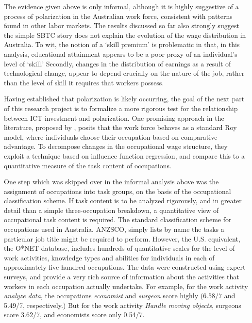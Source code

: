 \documentclass[a4paper,11pt,notitlepage]{article}
\begin{document}
The evidence given above is only informal, although it is highly suggestive of a process of polarization in the Australian work force, consistent with patterns found in other labor markets. The results discussed so far also strongly suggest the simple SBTC story does not explain the evolution of the wage distribution in Australia. To wit, the notion of a `skill premium' is problematic in that, in this analysis, educational attainment appears to be a poor proxy of an individual's level of `skill.' Secondly, changes in the distribution of earnings as a result of technological change, appear to depend crucially on the nature of the job, rather than the level of skill it requires that workers possess.

Having established that polarization is likely occurring, the goal of the next part of this research project is to formalize a more rigorous test for the relationship between ICT investment and polarization. One promising approach in the literature, proposed by \citet{Firpo2011}, posits that the work force behaves as a standard Roy model, where individuals choose their occupation based on comparative advantage. To decompose changes in the occupational wage structure, they exploit a technique based on influence function regression, and compare this to a quantitative measure of the task content of occupations.

One step which was skipped over in the informal analysis above was the assignment of occupations into task groups, on the basis of the occupational classification scheme. If task content is to be analyzed rigorously, and in greater detail than a simple three-occupation breakdown, a quantitative view of occupational task content is required. The standard classification scheme for occupations used in Australia, ANZSCO, simply lists by name the tasks a particular job title might be required to perform. However, the U.S. equivalent, the O*NET database, includes hundreds of quantitative scales for the level of work activities, knowledge types and abilities for individuals in each of approximately five hundred occupations. The data were constructed using expert surveys, and provide a very rich source of information about the activities that workers in each occupation actually undertake. For example, for the work activity {\em analyze data}, the occupations {\em economist} and {\em surgeon} score highly (6.58/7 and 5.49/7, respectively.) But for the work activity {\em Handle moving objects}, surgeons score 3.62/7, and economists score only 0.54/7.
\end{document}
